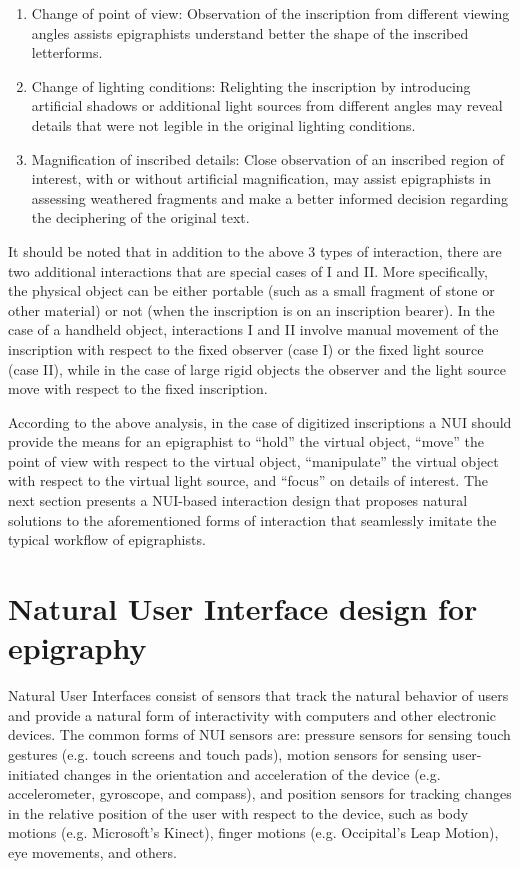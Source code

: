 \documentclass[amsthm,ebook]{saparticle}
\begin{document}
\begin{enumerate}
\item Change of point of view: Observation of the inscription from different viewing angles assists epigraphists
understand better the shape of the inscribed letterforms. 
\item Change of lighting conditions: Relighting the inscription by introducing artificial shadows or additional light
sources from different angles may reveal details that were not legible in the original lighting conditions.
\item Magnification of inscribed details: Close observation of an inscribed region of interest, with or without
artificial magnification, may assist epigraphists in assessing weathered fragments and make a better informed decision
regarding the deciphering of the original text.
\end{enumerate}
It should be noted that in addition to the above 3 types of interaction, there are two additional interactions that are
special cases of I and II. More specifically, the physical object can be either portable (such as a small fragment of
stone or other material) or not (when the inscription is on an inscription bearer). In the case of a handheld object,
interactions I and II involve manual movement of the inscription with respect to the fixed observer (case I) or the
fixed light source (case II), while in the case of large rigid objects the observer and the light source move with
respect to the fixed inscription. 

According to the above analysis, in the case of digitized inscriptions a NUI should provide the means for an epigraphist
to ``hold'' the virtual object, ``move'' the point of view with
respect to the virtual object, ``manipulate'' the virtual object with respect to the virtual
light source, and ``focus'' on details of interest. The next section presents a NUI-based
interaction design that proposes natural solutions to the aforementioned forms of interaction that seamlessly imitate
the typical workflow of epigraphists. 

\section{Natural User Interface design for epigraphy}


\noindent Natural User Interfaces consist of sensors that track the natural behavior of users and provide a natural form of
interactivity with computers and other electronic devices. The common forms of NUI sensors are: pressure sensors for
sensing touch gestures (e.g. touch screens and touch pads), motion sensors for sensing user-initiated changes in the
orientation and acceleration of the device (e.g. accelerometer, gyroscope, and compass), and position sensors for
tracking changes in the relative position of the user with respect to the device, such as body motions (e.g.
Microsoft's Kinect), finger motions (e.g. Occipital's Leap Motion), eye movements, and others.
\end{document}
